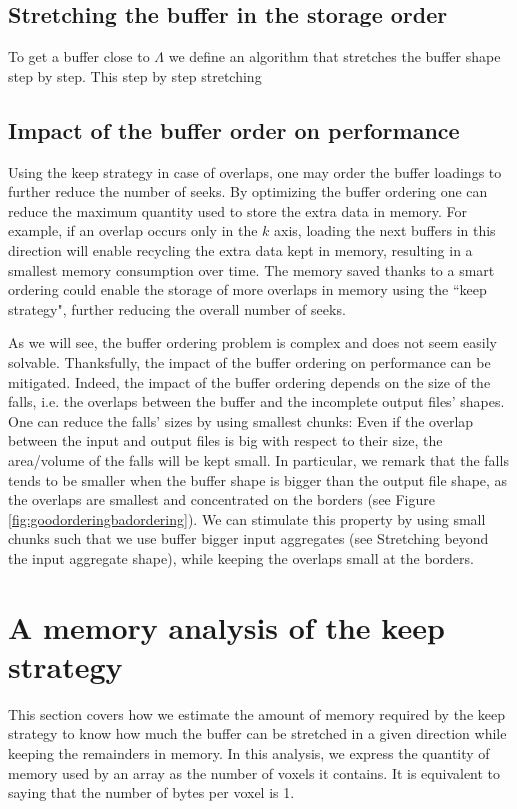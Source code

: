 \documentclass[conference]{IEEEtran}
\begin{document}
\subsection{Stretching the buffer in the storage order}
To get a buffer close to $\Lambda$ we define an algorithm that stretches the
buffer shape step by step. This step by step stretching 

\subsection{Impact of the buffer order on performance}
Using the keep strategy in case of overlaps, one may order the buffer loadings
to further reduce the number of seeks. By optimizing the buffer ordering one can
reduce the maximum quantity used to store the extra data in memory. For example,
if an overlap occurs only in the $k$ axis, loading the next buffers in this
direction will enable recycling the extra data kept in memory, resulting in a
smallest memory consumption over time. The memory saved thanks to a smart
ordering could enable the storage of more overlaps in memory using the
``keep strategy", further reducing the overall number of seeks.

As we will see, the buffer ordering problem is complex and does not seem easily
solvable. Thanksfully, the impact of the buffer ordering on performance can be
mitigated. Indeed, the impact of the buffer ordering depends on the size of the
falls, i.e. the overlaps between the buffer and the incomplete output files'
shapes. One can reduce the falls' sizes by using smallest chunks: Even if the
overlap between the input and output files is big with respect to their size,
the area/volume of the falls will be kept small. In particular, we remark that
the falls tends to be smaller when the buffer shape is bigger than the output
file shape, as the overlaps are smallest and concentrated on the borders (see
Figure \ref{fig:goodorderingbadordering}). We can stimulate this property by
using small chunks such that we use buffer bigger input aggregates (see
Stretching beyond the input aggregate shape), while keeping the overlaps small
at the borders.

\section{A memory analysis of the keep strategy}
This section covers how we estimate the amount of memory required by the keep
strategy to know how much the buffer can be stretched in a given direction while
keeping the remainders in memory. In this analysis, we express the quantity of
memory used by an array as the number of voxels it contains. It is equivalent
to saying that the number of bytes per voxel is 1.
\end{document}

